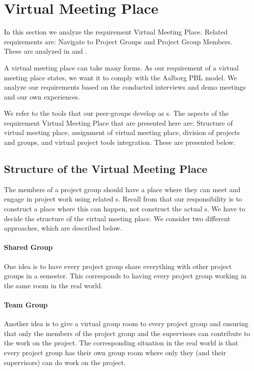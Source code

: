 \section{Virtual Meeting Place}
\label{sec:virtualMeetingPlace}
\label{sec:projectgroup}
In this section we analyze the requirement Virtual Meeting Place.
Related requirements are: Navigate to Project Groups and Project Group Members.
These are analyzed in  and .

A virtual meeting place can take many forms.
As our requirement of a virtual meeting place states, we want it to comply with the Aalborg PBL model.
We analyze our requirements based on the conducted interviews and demo meetings and our own experiences.

We refer to the tools that our peer-groups develop as \detdeandrelaver{}s.
The aspects of the requirement Virtual Meeting Place that are presented here are: Structure of virtual meeting place, assignment of virtual meeting place, division of projects and groups, and virtual project tools integration.
These are presented below.


\subsection{Structure of the Virtual Meeting Place}
The members of a project group should have a place where they can meet and engage in project work using related \detdeandrelaver[]s.
Recall from  that our responsibility is to construct a place where this can happen, not construct the actual \detdeandrelaver[]s.
We have to decide the structure of the virtual meeting place.
We consider two different approaches, which are described below.
\pagebreak{}

\paragraph{Shared Group} One idea is to have every project group share everything with other project groups in a semester.
This corresponds to having every project group working in the same room in the real world.

\paragraph{Team Group} Another idea is to give a virtual group room to every project group and ensuring that only the members of the project group and the supervisors can contribute to the work on the project.
The corresponding situation in the real world is that every project group has their own group room where only they (and their supervisors) can do work on the project. \\

